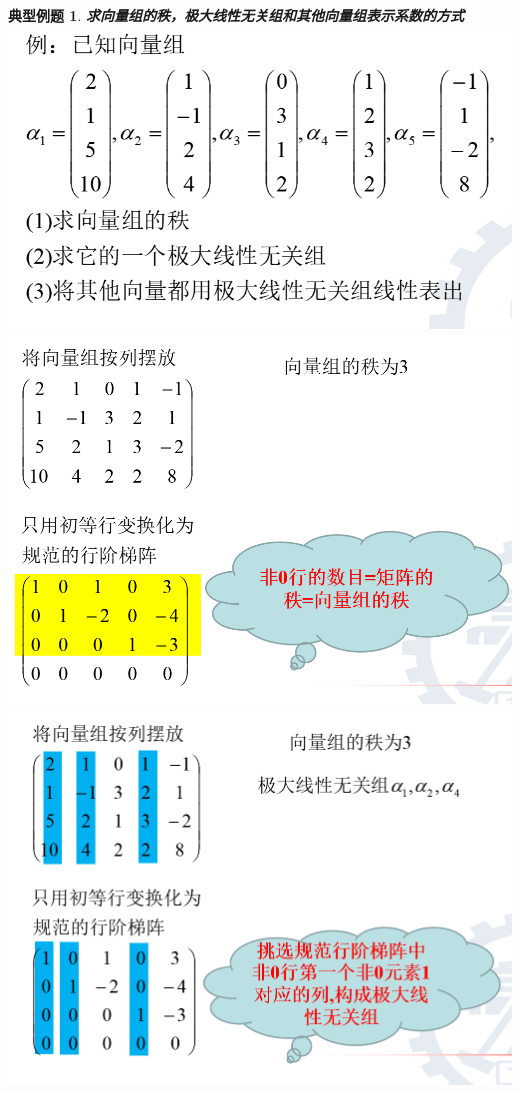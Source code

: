 \documentclass[12pt,oneside]{ctexbook}
\newtheorem{problem}[subsection]{典型例题}
\begin{document}
\begin{problem}
    \textbf{求向量组的秩，极大线性无关组和其他向量组表示系数的方式}
    \\\includegraphics[scale=0.4]{problem3.4.png}
    \includegraphics[scale=0.4]{problem3.5.png}
    \\\includegraphics[scale=0.4]{problem3.6.png}

\end{problem}
\end{document}
